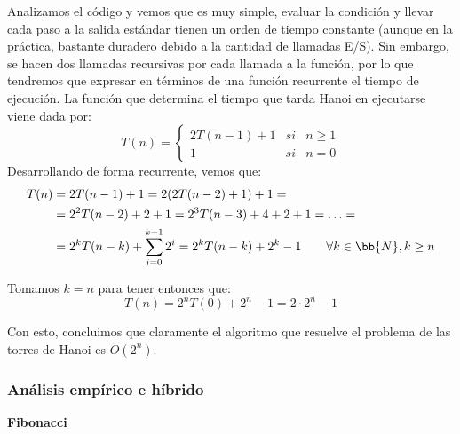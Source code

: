 \documentclass[12pt]{article}
\begin{document}
    
    Analizamos el código y vemos que es muy simple, evaluar la condición y
    llevar cada paso a la salida estándar tienen un orden de tiempo constante (aunque en la práctica, bastante duradero debido a la cantidad de llamadas E/S).
    Sin embargo, se hacen dos llamadas recursivas por cada llamada a la función, por lo que tendremos que expresar en términos de una función recurrente el tiempo de ejecución. La función que determina el tiempo que tarda Hanoi en ejecutarse viene dada por:
    $$T(n) = \left\{\begin{array}{lcl}
        2T(n-1) + 1 & si & n \geq 1 \\
        1 & si & n = 0
    \end{array} \right.$$
    Desarrollando de forma recurrente, vemos que:
    \begin{align*}
        T(n) &= 2T(n-1) + 1 = 2(2T(n-2)+1) + 1 
        =\\&= 2^2T(n-2) + 2 + 1 = 2^3 T(n-3) + 4 + 2 + 1=\ldots
        =\\&= 2^kT(n-k) + \sum^{k-1}_{i=0} 2^i = 2^kT(n-k) + 2^k - 1 \qquad \forall k\in \bb{N}, k\geq n
    \end{align*}
    
    Tomamos $k = n$ para tener entonces que:
    $$T(n) = 2^n T(0) + 2^n - 1 = 2 \cdot 2^n - 1$$

    Con esto, concluimos que claramente el algoritmo que resuelve el problema de las torres de Hanoi es $O(2^n)$.
    
    \subsubsection{Análisis empírico e híbrido}
    \textbf{Fibonacci}
    
\end{document}
